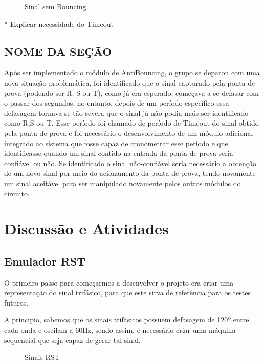 \documentclass[12pt,a4paper,openany]{abntex2}
\begin{document}
\begin{figure}[!htp]
	\centering
	\caption{Sinal sem Bouncing}
	\label{fig:sinal-sem-bouncing}
\end{figure}

* Explicar necessidade do Timeout
\section{NOME DA SEÇÃO}

Após ser implementado o módulo de AntiBouncing, o grupo se deparou com uma nova
situação problemática, foi identificado que o sinal capturado pela ponta de prova
(podendo ser R, S ou T), como já era esperado, começava a se defasar com o passar
dos segundos, no entanto, depois de um período específico essa defasagem tornava-se
tão severa que o sinal já não podia mais ser identificado como R,S ou T.
Esse período foi chamado de período de Timeout do sinal obtido pela ponta de prova
e foi necessário o desenvolvimento de um módulo adicional integrado ao sistema que
fosse capaz de cronometrar esse período e que identificasse quando um sinal contido
na entrada da ponta de prova seria confiável ou não.
Se identificado o sinal não-confiável seria necessário a obtenção de um novo sinal
por meio do acionamento da ponta de prova, tendo novamente um sinal aceitável para
ser manipulado novamente pelos outros módulos do circuito.

\chapter{Discussão e Atividades}

\section{Emulador RST}

O primeiro passo para começarmos a desenvolver o projeto era criar uma representação do sinal trifásico, para que este sirva de referência para os testes futuros.

A principio, sabemos que os sinais trifásicos possuem defasagem de 120º entre cada onda e oscilam a 60Hz, sendo assim, é necessário criar uma máquina sequencial que seja capaz de gerar tal sinal.

\begin{figure}[!htp]
	\centering
	\caption{Sinais RST}
	\label{fig:sinais-rst}
\end{figure}
\end{document}
